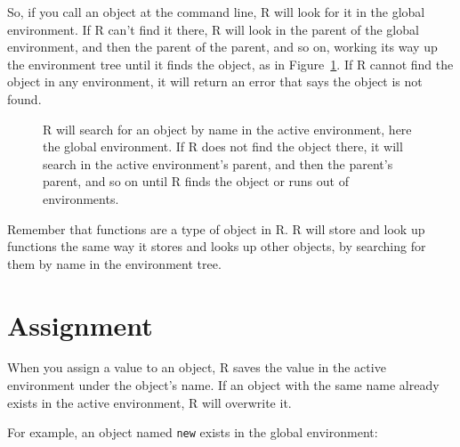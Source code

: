 \documentclass[
  letterpaper,
  DIV=11,
  numbers=noendperiod]{scrbook}
\makeatletter
\newcommand*\pandocbounded[1]{%
  \sbox\pandoc@box{#1}%
  \Gscale@div\@tempa{\textheight}{\dimexpr\ht\pandoc@box+\dp\pandoc@box\relax}%
  \Gscale@div\@tempb{\linewidth}{\wd\pandoc@box}%
  \ifdim\@tempb\p@<\@tempa\p@\let\@tempa\@tempb\fi%
  \ifdim\@tempa\p@<\p@\scalebox{\@tempa}{\usebox\pandoc@box}%
  \else\usebox{\pandoc@box}%
  \fi%
}
\makeatother
\begin{document}
So, if you call an object at the command line, R will look for it in the
global environment. If R can't find it there, R will look in the parent
of the global environment, and then the parent of the parent, and so on,
working its way up the environment tree until it finds the object, as in
Figure~\ref{fig-path}. If R cannot find the object in any environment,
it will return an error that says the object is not found.

\begin{figure}

\centering{

\pandocbounded{\texttt{[image: images/hopr\_0603.png]}}

}

\caption{\label{fig-path}R will search for an object by name in the
active environment, here the global environment. If R does not find the
object there, it will search in the active environment's parent, and
then the parent's parent, and so on until R finds the object or runs out
of environments.}

\end{figure}%

\begin{tcolorbox}[enhanced jigsaw, breakable, colback=white, colbacktitle=quarto-callout-tip-color!10!white, arc=.35mm, bottomrule=.15mm, coltitle=black, left=2mm, rightrule=.15mm, colframe=quarto-callout-tip-color-frame, leftrule=.75mm, opacitybacktitle=0.6, bottomtitle=1mm, toptitle=1mm, titlerule=0mm, opacityback=0, title=\textcolor{quarto-callout-tip-color}{\faLightbulb}\hspace{0.5em}{Tip}, toprule=.15mm]

Remember that functions are a type of object in R. R will store and look
up functions the same way it stores and looks up other objects, by
searching for them by name in the environment tree.

\end{tcolorbox}

\section{Assignment}\label{assignment}

When you assign a value to an object, R saves the value in the active
environment under the object's name. If an object with the same name
already exists in the active environment, R will overwrite it.

For example, an object named \texttt{new} exists in the global
environment:
\end{document}
